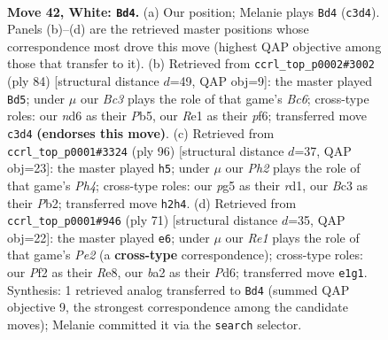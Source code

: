 \documentclass[11pt]{article}
\begin{document}
\clearpage

\begin{figure}[p]\centering
\begin{subfigure}{0.46\textwidth}\centering
\resizebox{\linewidth}{!}{%
\newchessgame
\chessboard[
  setfen={5k2/3R4/2rn4/1p4p1/r7/2B1P1P1/b4PKP/4R3 w - - 2 42},
  showmover=false,
  pgfstyle=straightmove, color=movearrow, markmove={c3-d4}
]}
\caption{}
\end{subfigure}\hfill
\begin{subfigure}{0.46\textwidth}\centering
\resizebox{\linewidth}{!}{%
\newchessgame
\chessboard[
  setfen={3r1k2/8/2B2pp1/1PR4p/1r6/4PKP1/5P1P/8 w - - 0 43},
  showmover=false,
  pgfstyle=straightmove, color=movearrow, markmove={c6-d5}
]}
\caption{}
\end{subfigure}
\\[4pt]
\begin{subfigure}{0.46\textwidth}\centering
\resizebox{\linewidth}{!}{%
\newchessgame
\chessboard[
  setfen={5k2/8/p7/1p6/3bBP1P/P3n1PK/1P2R3/3r4 w - - 11 49},
  showmover=false,
  pgfstyle=straightmove, color=movearrow, markmove={h4-h5}
]}
\caption{}
\end{subfigure}\hfill
\begin{subfigure}{0.46\textwidth}\centering
\resizebox{\linewidth}{!}{%
\newchessgame
\chessboard[
  setfen={4r3/4p3/3p1k2/1r3pp1/1NR5/1P2P2p/P7/R6K b - - 0 36},
  showmover=false,
  pgfstyle=straightmove, color=movearrow, markmove={e7-e6}
]}
\caption{}
\end{subfigure}
\caption{\textbf{Move 42, White: \texttt{Bd4}.} (a) Our position; Melanie plays \texttt{Bd4} (\texttt{c3d4}). Panels (b)--(d) are the retrieved master positions whose correspondence most drove this move (highest QAP objective among those that transfer to it). (b) Retrieved from \texttt{ccrl\_top\_p0002\#3002} (ply 84) [structural distance $d$=49, QAP obj=9]: the master played \texttt{Bd5}; under $\mu$ our \emph{Bc3} plays the role of that game's \emph{Bc6}; cross-type roles: our \emph{n}d6 as their \emph{P}b5, our \emph{R}e1 as their \emph{p}f6; transferred move \texttt{c3d4} \textbf{(endorses this move)}. (c) Retrieved from \texttt{ccrl\_top\_p0001\#3324} (ply 96) [structural distance $d$=37, QAP obj=23]: the master played \texttt{h5}; under $\mu$ our \emph{Ph2} plays the role of that game's \emph{Ph4}; cross-type roles: our \emph{p}g5 as their \emph{r}d1, our \emph{B}c3 as their \emph{P}b2; transferred move \texttt{h2h4}. (d) Retrieved from \texttt{ccrl\_top\_p0001\#946} (ply 71) [structural distance $d$=35, QAP obj=22]: the master played \texttt{e6}; under $\mu$ our \emph{Re1} plays the role of that game's \emph{Pe2} (a \textbf{cross-type} correspondence); cross-type roles: our \emph{P}f2 as their \emph{R}e8, our \emph{b}a2 as their \emph{P}d6; transferred move \texttt{e1g1}. Synthesis: 1 retrieved analog transferred to \texttt{Bd4} (summed QAP objective 9, the strongest correspondence among the candidate moves); Melanie committed it via the \texttt{search} selector.}
\label{fig:thought-m82}
\end{figure}
\end{document}
